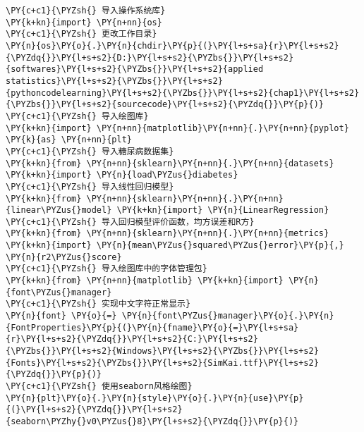 \begin{Verbatim}[commandchars=\\\{\}]
\PY{c+c1}{\PYZsh{} 导入操作系统库}
\PY{k+kn}{import} \PY{n+nn}{os}
\PY{c+c1}{\PYZsh{} 更改工作目录}
\PY{n}{os}\PY{o}{.}\PY{n}{chdir}\PY{p}{(}\PY{l+s+sa}{r}\PY{l+s+s2}{\PYZdq{}}\PY{l+s+s2}{D:}\PY{l+s+s2}{\PYZbs{}}\PY{l+s+s2}{softwares}\PY{l+s+s2}{\PYZbs{}}\PY{l+s+s2}{applied statistics}\PY{l+s+s2}{\PYZbs{}}\PY{l+s+s2}{pythoncodelearning}\PY{l+s+s2}{\PYZbs{}}\PY{l+s+s2}{chap1}\PY{l+s+s2}{\PYZbs{}}\PY{l+s+s2}{sourcecode}\PY{l+s+s2}{\PYZdq{}}\PY{p}{)}
\PY{c+c1}{\PYZsh{} 导入绘图库}
\PY{k+kn}{import} \PY{n+nn}{matplotlib}\PY{n+nn}{.}\PY{n+nn}{pyplot} \PY{k}{as} \PY{n+nn}{plt}
\PY{c+c1}{\PYZsh{} 导入糖尿病数据集}
\PY{k+kn}{from} \PY{n+nn}{sklearn}\PY{n+nn}{.}\PY{n+nn}{datasets} \PY{k+kn}{import} \PY{n}{load\PYZus{}diabetes}
\PY{c+c1}{\PYZsh{} 导入线性回归模型}
\PY{k+kn}{from} \PY{n+nn}{sklearn}\PY{n+nn}{.}\PY{n+nn}{linear\PYZus{}model} \PY{k+kn}{import} \PY{n}{LinearRegression}
\PY{c+c1}{\PYZsh{} 导入回归模型评价函数，均方误差和R方}
\PY{k+kn}{from} \PY{n+nn}{sklearn}\PY{n+nn}{.}\PY{n+nn}{metrics} \PY{k+kn}{import} \PY{n}{mean\PYZus{}squared\PYZus{}error}\PY{p}{,} \PY{n}{r2\PYZus{}score}
\PY{c+c1}{\PYZsh{} 导入绘图库中的字体管理包}
\PY{k+kn}{from} \PY{n+nn}{matplotlib} \PY{k+kn}{import} \PY{n}{font\PYZus{}manager}
\PY{c+c1}{\PYZsh{} 实现中文字符正常显示}
\PY{n}{font} \PY{o}{=} \PY{n}{font\PYZus{}manager}\PY{o}{.}\PY{n}{FontProperties}\PY{p}{(}\PY{n}{fname}\PY{o}{=}\PY{l+s+sa}{r}\PY{l+s+s2}{\PYZdq{}}\PY{l+s+s2}{C:}\PY{l+s+s2}{\PYZbs{}}\PY{l+s+s2}{Windows}\PY{l+s+s2}{\PYZbs{}}\PY{l+s+s2}{Fonts}\PY{l+s+s2}{\PYZbs{}}\PY{l+s+s2}{SimKai.ttf}\PY{l+s+s2}{\PYZdq{}}\PY{p}{)}
\PY{c+c1}{\PYZsh{} 使用seaborn风格绘图}
\PY{n}{plt}\PY{o}{.}\PY{n}{style}\PY{o}{.}\PY{n}{use}\PY{p}{(}\PY{l+s+s2}{\PYZdq{}}\PY{l+s+s2}{seaborn\PYZhy{}v0\PYZus{}8}\PY{l+s+s2}{\PYZdq{}}\PY{p}{)}


\end{Verbatim}
